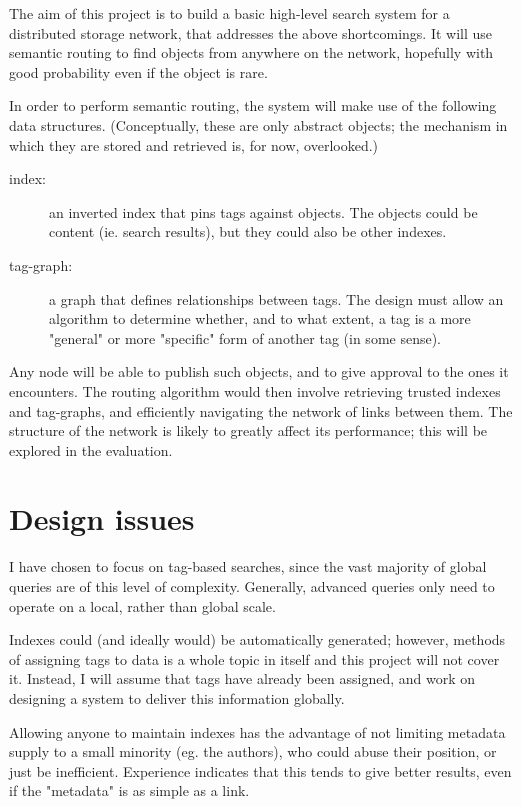 \documentclass[12pt]{article}
\begin{document}
The aim of this project is to build a basic high-level search system for a
distributed storage network, that addresses the above shortcomings. It will use
semantic routing to find objects from anywhere on the network, hopefully with
good probability even if the object is rare.

In order to perform semantic routing, the system will make use of the following
data structures. (Conceptually, these are only abstract objects; the mechanism
in which they are stored and retrieved is, for now, overlooked.)

\begin{description}
\item [index:] an inverted index that pins tags against objects. The objects
  could be content (ie. search results), but they could also be other indexes.
\item [tag-graph:] a graph that defines relationships between tags. The design
  must allow an algorithm to determine whether, and to what extent, a tag is
  a more "general" or more "specific" form of another tag (in some sense).
\end{description}

Any node will be able to publish such objects, and to give approval to the ones
it encounters. The routing algorithm would then involve retrieving trusted
indexes and tag-graphs, and efficiently navigating the network of links between
them. The structure of the network is likely to greatly affect its performance;
this will be explored in the evaluation.


\section*{Design issues}

I have chosen to focus on tag-based searches, since the vast majority of global
queries are of this level of complexity. Generally, advanced queries only need
to operate on a local, rather than global scale.

Indexes could (and ideally would) be automatically generated; however, methods
of assigning tags to data is a whole topic in itself and this project will not
cover it. Instead, I will assume that tags have already been assigned, and work
on designing a system to deliver this information globally.

Allowing anyone to maintain indexes has the advantage of not limiting metadata
supply to a small minority (eg. the authors), who could abuse their position,
or just be inefficient. Experience indicates that this tends to give better
results, even if the "metadata" is as simple as a link.
\end{document}
